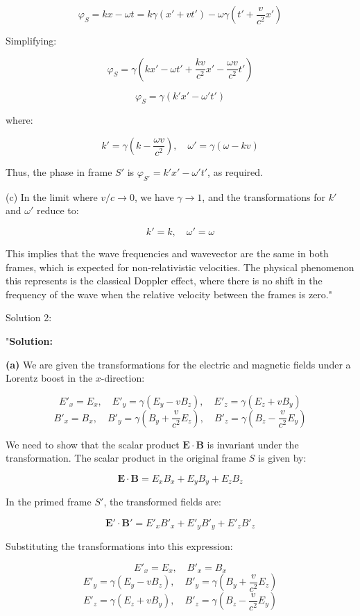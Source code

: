\[
\varphi_S = kx - \omega t = k \gamma (x' + vt') - \omega \gamma \left( t' + \frac{v}{c^2} x' \right)
\]

Simplifying:

\[
\varphi_S = \gamma \left( kx' - \omega t' + \frac{kv}{c^2} x' - \frac{\omega v}{c^2} t' \right)
\]

\[
\varphi_S = \gamma \left( k' x' - \omega' t' \right)
\]

where:

\[
k' = \gamma \left( k - \frac{\omega v}{c^2} \right), \quad \omega' = \gamma (\omega - kv)
\]

Thus, the phase in frame \( S' \) is \( \varphi_{S'} = k'x' - \omega' t' \), as required.

(c) In the limit where \( v / c \to 0 \), we have \( \gamma \to 1 \), and the transformations for \( k' \) and \( \omega' \) reduce to:

\[
k' = k, \quad \omega' = \omega
\]

This implies that the wave frequencies and wavevector are the same in both frames, which is expected for non-relativistic velocities. The physical phenomenon this represents is the classical Doppler effect, where there is no shift in the frequency of the wave when the relative velocity between the frames is zero."

Solution 2:

"\textbf{Solution:}

\textbf{(a)} We are given the transformations for the electric and magnetic fields under a Lorentz boost in the \( x \)-direction:

\[
E'_x = E_x, \quad E'_y = \gamma (E_y - v B_z), \quad E'_z = \gamma (E_z + v B_y)
\]
\[
B'_x = B_x, \quad B'_y = \gamma \left( B_y + \frac{v}{c^2} E_z \right), \quad B'_z = \gamma \left( B_z - \frac{v}{c^2} E_y \right)
\]

We need to show that the scalar product \( \mathbf{E} \cdot \mathbf{B} \) is invariant under the transformation. The scalar product in the original frame \( S \) is given by:

\[
\mathbf{E} \cdot \mathbf{B} = E_x B_x + E_y B_y + E_z B_z
\]

In the primed frame \( S' \), the transformed fields are:

\[
\mathbf{E}' \cdot \mathbf{B}' = E'_x B'_x + E'_y B'_y + E'_z B'_z
\]

Substituting the transformations into this expression:

\[
E'_x = E_x, \quad B'_x = B_x
\]
\[
E'_y = \gamma (E_y - v B_z), \quad B'_y = \gamma \left( B_y + \frac{v}{c^2} E_z \right)
\]
\[
E'_z = \gamma (E_z + v B_y), \quad B'_z = \gamma \left( B_z - \frac{v}{c^2} E_y \right)
\]

